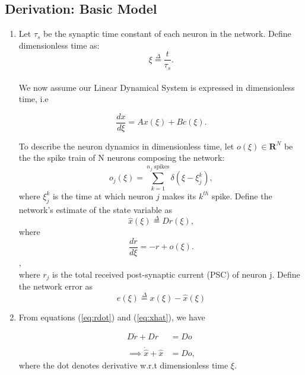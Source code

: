 \subsection{Derivation: Basic Model}

\begin{enumerate}
    \item Let $\tau_s$ be the synaptic time constant of each neuron in the network. Define dimensionless time as:
    \begin{equation*}
        \xi \overset{\Delta}{=} \frac{t}{\tau_s}.
    \end{equation*}\\
    We now assume our Linear Dynamical System is expressed in dimensionless time, i.e
    
    \begin{equation}
        \label{eq:lds_dimensionless}
        \frac{dx}{d\xi} = Ax(\xi) + B c(\xi).
    \end{equation}
    
    To describe the neuron dynamics in dimensionless time, let $o(\xi) \in \mathbf{R}^{N}$ be the the spike train of N neurons composing the network:
    \begin{equation*}
        o_j(\xi) = \sum_{k=1}^{\text{$n_j$ spikes}} \delta(\xi - \xi_{j}^{k}),
    \end{equation*}
    where $\xi_j^k$ is the time at which neuron $j$ makes its $k^{th}$ spike. 
    Define the network's estimate of the state variable as
    \begin{equation}
        \label{eq:xhat}
        \hat{x}(\xi)
        \overset{\Delta}{=} D r(\xi), 
    \end{equation}
    where
    \begin{equation}
    \label{eq:rdot}
        \frac{dr}{d \xi} = -r + o(\xi).
    \end{equation},\\
    where $r_j$ is the total received post-synaptic current (PSC) of neuron j. 
    Define the network error as
    \begin{equation}
    \label{eq:error_def}
        e(\xi) \overset{\Delta}{=} x(\xi) - \hat{x}(\xi)
    \end{equation}
    
    \item From equations (\ref{eq:rdot}) and (\ref{eq:xhat}), we have
    
    \begin{align*}
        D \dot{r} + D r &= Do \\
        \\
        \implies \dot{\hat{x}} + \hat{x} &= Do,
    \end{align*}
    where the dot denotes derivative w.r.t dimensionless time $\xi$.


\end{enumerate}
